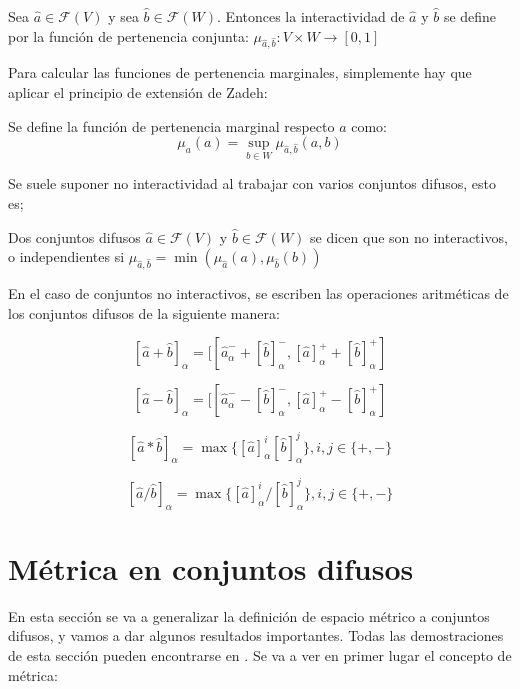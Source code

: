   \begin{definicion}
    Sea $\hat{a} \in \mathcal{F}(V)$ y sea $\hat{b} \in \mathcal{F}(W)$. Entonces la interactividad de $\hat{a}$ y $\hat{b}$ se define por la función de pertenencia conjunta: $\mu_{\hat{a}, \hat{b}} : V \times W \rightarrow [0, 1]$
  \end{definicion}
  Para calcular las funciones de pertenencia marginales, simplemente hay que aplicar el principio de extensión de Zadeh:

  \begin{definicion}
    Se define la función de pertenencia marginal respecto $a$ como:
    \[
    \mu_a(a) = \sup\limits_{b \in W} \mu_{\hat{a}, \hat{b}} (a, b)
    \]
  \end{definicion}

  Se suele suponer no interactividad al trabajar con varios conjuntos difusos, esto es;

  \begin{definicion}
    Dos conjuntos difusos $\hat{a} \in \mathcal{F}(V)$ y $\hat{b} \in \mathcal{F}(W)$ se dicen que son no interactivos, o independientes si $\mu_{\hat{a}, \hat{b}} = \min(\mu_{\hat{a}}(a), \mu_{\hat{b}}(b))$
  \end{definicion}

  \begin{ejemplo}
    En el caso de conjuntos no interactivos, se escriben las operaciones aritméticas de los conjuntos difusos de la siguiente manera:

    \[
      [\hat{a} + \hat{b}]_\alpha = [[\hat{a}^-_\alpha + [\hat{b}]_\alpha^-, [\hat{a}]^+_\alpha + [\hat{b}]_\alpha^+]
        \]

        \[
          [\hat{a} - \hat{b}]_\alpha = [[\hat{a}^-_\alpha - [\hat{b}]_\alpha^-, [\hat{a}]^+_\alpha - [\hat{b}]_\alpha^+]
            \]

            \[
              [\hat{a} * \hat{b}]_\alpha = \max\{ [\hat{a}]_\alpha^i [\hat{b}]^j_\alpha \}, i, j \in \{+, -\}
              \]

              \[
                [\hat{a} / \hat{b}]_\alpha = \max\{ [\hat{a}]_\alpha^i / [\hat{b}]^j_\alpha \}, i, j \in \{+, -\}
                \]
  \end{ejemplo}

  \section{Métrica en conjuntos difusos}
  En esta sección se va a generalizar la definición de espacio métrico a conjuntos difusos, y vamos a dar algunos resultados importantes. Todas las demostraciones de esta sección pueden encontrarse en \cite{apuntesfuzzy}. Se va a ver en primer lugar el concepto de métrica:

